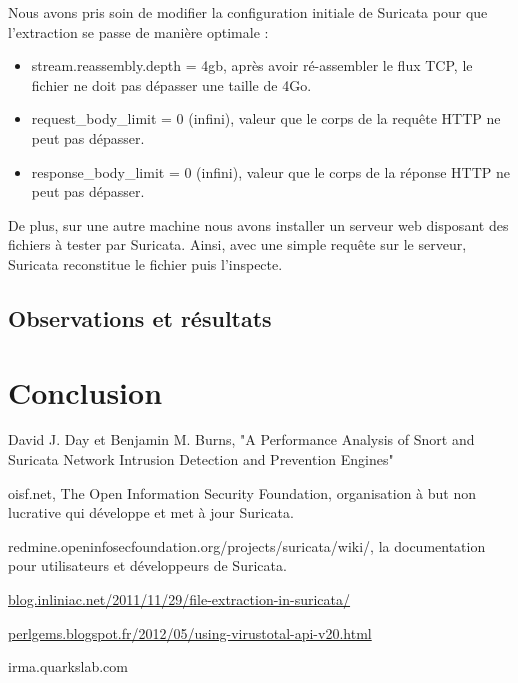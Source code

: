 \documentclass[smallextended]{svjour3}       %
\begin{document}
Nous avons pris soin de modifier la configuration initiale de Suricata pour que l'extraction se passe de manière optimale :
\begin{itemize}
\item stream.reassembly.depth = 4gb, après avoir ré-assembler le flux TCP, le fichier ne doit pas dépasser une taille de 4Go.
\item request\_body\_limit = 0 (infini), valeur que le corps de la requête HTTP ne peut pas dépasser.
\item response\_body\_limit = 0 (infini), valeur que le corps de la réponse HTTP ne peut pas dépasser.
\end{itemize}
De plus, sur une autre machine nous avons installer un serveur web disposant des fichiers à tester par Suricata. Ainsi, avec une simple requête sur le serveur, Suricata reconstitue le fichier puis l'inspecte.

\subsection{Observations et résultats}
\label{3.2résultats}

\section{Conclusion}
\label{2.3ids}

\newpage
\begin{thebibliography}{}
%

David J. Day et Benjamin M. Burns, "A Performance Analysis of Snort and Suricata Network Intrusion Detection and Prevention Engines"

oisf.net, The Open Information Security Foundation, organisation à but non lucrative qui développe et met à jour Suricata.

redmine.openinfosecfoundation.org/projects/suricata/wiki/, la documentation pour utilisateurs et développeurs de Suricata.

\url{blog.inliniac.net/2011/11/29/file-extraction-in-suricata/}

\url{perlgems.blogspot.fr/2012/05/using-virustotal-api-v20.html}

irma.quarkslab.com


%

\end{thebibliography}
\end{document}
